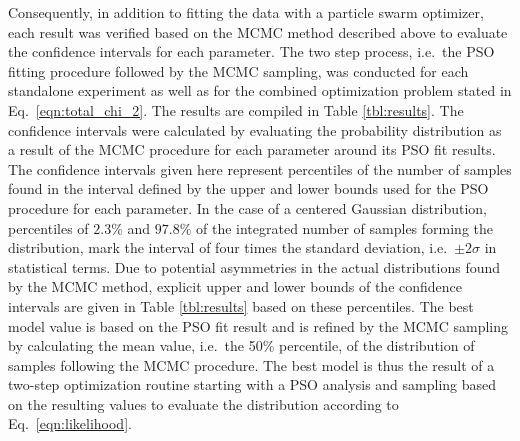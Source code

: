 Consequently, in addition to fitting the data with a particle swarm optimizer, 
each result was verified based on the MCMC method described above to evaluate 
the confidence intervals for each parameter. The two step process, i.e.~the PSO 
fitting procedure followed by the MCMC sampling, was conducted for each 
standalone experiment as well as for the combined optimization problem stated 
in Eq.~\eqref{eqn:total_chi_2}. The results are compiled in Table 
\ref{tbl:results}. The confidence intervals were calculated by evaluating the 
probability distribution as a result of the MCMC procedure for each parameter 
around its PSO fit results. The confidence intervals given here represent 
percentiles of the number of samples found in the interval defined by the upper 
and lower bounds used for the PSO procedure for each parameter. In the case of 
a centered Gaussian distribution, percentiles of $2.3\%$ and $97.8\%$ of the 
integrated number of samples forming the distribution, mark the interval of 
four times the standard deviation, i.e.~$\pm 2\sigma$ in statistical terms. Due 
to potential asymmetries in the actual distributions found by the MCMC method, 
explicit upper and lower bounds of the confidence intervals are given in Table 
\ref{tbl:results} based on these percentiles. The best model value is based on 
the PSO fit result and is refined by the MCMC sampling by calculating the mean 
value, i.e.~the 50\% percentile, of the distribution of samples following the 
MCMC procedure. The best model is thus the result of a two-step optimization 
routine starting with a PSO analysis and sampling based on the resulting values 
to evaluate the distribution according to Eq.~\eqref{eqn:likelihood}.
\onecolumn
